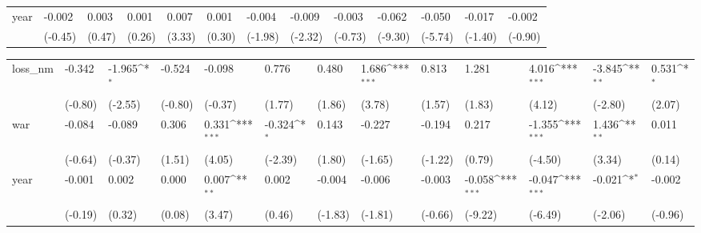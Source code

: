 \begin{tabular}{p{1.5cm} p{1.7cm} p{1.7cm} p{1.7cm} p{1.7cm} p{1.7cm} p{1.7cm} p{1.7cm} p{1.7cm} p{1.7cm} p{1.7cm} p{1.7cm} p{1.7cm}}
year            &   -0.002         &    0.003         &    0.001         &    0.007\sym{**} &    0.001         &   -0.004         &   -0.009\sym{*}  &   -0.003         &   -0.062\sym{***}&   -0.050\sym{***}&   -0.017         &   -0.002         \\
                &  (-0.45)         &   (0.47)         &   (0.26)         &   (3.33)         &   (0.30)         &  (-1.98)         &  (-2.32)         &  (-0.73)         &  (-9.30)         &  (-5.74)         &  (-1.40)         &  (-0.90)         \\
\end{tabular}
\def\sym#1{\ifmmode^{#1}\else\(^{#1}\)\fi}
\begin{tabular}{p{1.5cm} p{1.7cm} p{1.7cm} p{1.7cm} p{1.7cm} p{1.7cm} p{1.7cm} p{1.7cm} p{1.7cm} p{1.7cm} p{1.7cm} p{1.7cm} p{1.7cm}}
\hline
loss\_nm         &   -0.342         &   -1.965\sym{*}  &   -0.524         &   -0.098         &    0.776         &    0.480         &    1.686\sym{***}&    0.813         &    1.281         &    4.016\sym{***}&   -3.845\sym{**} &    0.531\sym{*}  \\
                &  (-0.80)         &  (-2.55)         &  (-0.80)         &  (-0.37)         &   (1.77)         &   (1.86)         &   (3.78)         &   (1.57)         &   (1.83)         &   (4.12)         &  (-2.80)         &   (2.07)         \\
war             &   -0.084         &   -0.089         &    0.306         &    0.331\sym{***}&   -0.324\sym{*}  &    0.143         &   -0.227         &   -0.194         &    0.217         &   -1.355\sym{***}&    1.436\sym{**} &    0.011         \\
                &  (-0.64)         &  (-0.37)         &   (1.51)         &   (4.05)         &  (-2.39)         &   (1.80)         &  (-1.65)         &  (-1.22)         &   (0.79)         &  (-4.50)         &   (3.34)         &   (0.14)         \\
year            &   -0.001         &    0.002         &    0.000         &    0.007\sym{**} &    0.002         &   -0.004         &   -0.006         &   -0.003         &   -0.058\sym{***}&   -0.047\sym{***}&   -0.021\sym{*}  &   -0.002         \\
                &  (-0.19)         &   (0.32)         &   (0.08)         &   (3.47)         &   (0.46)         &  (-1.83)         &  (-1.81)         &  (-0.66)         &  (-9.22)         &  (-6.49)         &  (-2.06)         &  (-0.96)         \\
\end{tabular}
